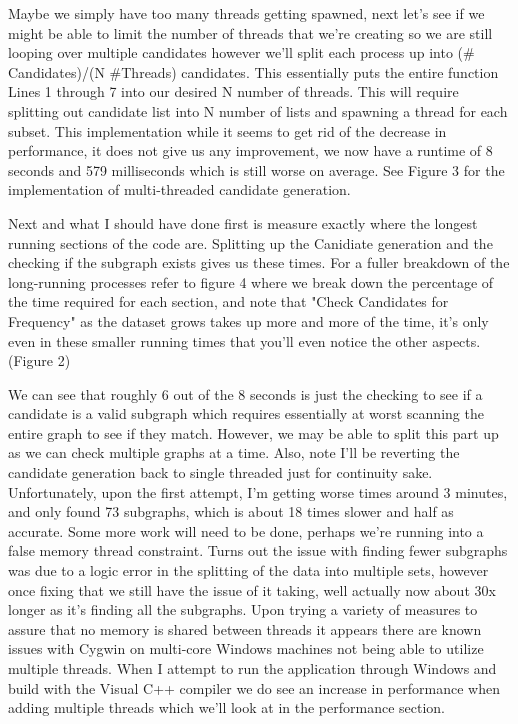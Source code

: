 \documentclass{article}
\begin{document}
Maybe we simply have too many threads getting spawned, next let's see if we might be able to limit the number of threads that we're creating so we are still looping over multiple candidates however we'll split each process up into (\# Candidates)/(N \#Threads) candidates. This essentially puts the entire function Lines 1 through 7 into our desired N number of threads. This will require splitting out candidate list into N number of lists and spawning a thread for each subset. This implementation while it seems to get rid of the decrease in performance, it does not give us any improvement, we now have a runtime of 8 seconds and 579 milliseconds which is still worse on average. See Figure 3 for the implementation of multi-threaded candidate generation.

Next and what I should have done first is measure exactly where the longest running sections of the code are. Splitting up the Canidiate generation and the checking if the subgraph exists gives us these times. For a fuller breakdown of the long-running processes refer to figure 4 where we break down the percentage of the time required for each section, and note that "Check Candidates for Frequency" as the dataset grows takes up more and more of the time, it's only even in these smaller running times that you'll even notice the other aspects. (Figure 2)

We can see that roughly 6 out of the 8 seconds is just the checking to see if a candidate is a valid subgraph which requires essentially at worst scanning the entire graph to see if they match. However, we may be able to split this part up as we can check multiple graphs at a time. Also, note I'll be reverting the candidate generation back to single threaded just for continuity sake. Unfortunately, upon the first attempt, I'm getting worse times around 
3 minutes, and only found 73 subgraphs, which is about 18 times slower and half as accurate. Some more work will need to be done, perhaps we're running into a false memory thread constraint. Turns out the issue with finding fewer subgraphs was due to a logic error in the splitting of the data into multiple sets, however once fixing that we still have the issue of it taking, well actually now about 30x longer as it's finding all the subgraphs. Upon trying a variety of measures to assure that no memory is shared between threads it appears there are known issues with Cygwin on multi-core Windows machines not being able to utilize multiple threads. When I attempt to run the application through Windows and build with the Visual C++ compiler we do see an increase in performance when adding multiple threads which we'll look at in the performance section.
\end{document}
